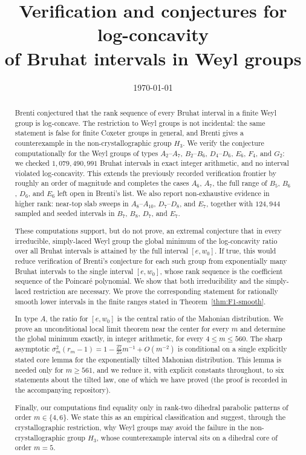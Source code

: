 \documentclass[11pt]{amsart}
\title[Log-concavity of Bruhat intervals in Weyl groups]
{Verification and conjectures for log-concavity\\ of Bruhat intervals in Weyl groups}
\author{}
\date{\today}
\theoremstyle{plain}
\theoremstyle{definition}
\theoremstyle{remark}
\begin{document}
\begin{abstract}
Brenti conjectured that the rank sequence of every Bruhat interval in a
finite Weyl group is log-concave. The restriction to Weyl groups is not
incidental: the same statement is false for finite Coxeter groups in
general, and Brenti gives a counterexample in the non-crystallographic
group $H_3$. We verify the conjecture
computationally for the Weyl groups of types $A_2$--$A_7$, $B_2$--$B_6$,
$D_4$--$D_6$, $E_6$, $F_4$, and $G_2$: we checked
$1{,}079{,}490{,}991$ Bruhat intervals in exact integer arithmetic, and no
interval violated log-concavity. This extends the previously recorded
verification frontier by roughly an order of magnitude and completes the
cases $A_6$, $A_7$, the full range of $B_5$, $B_6$, $D_6$, and $E_6$ left
open in Brenti's list. We also report non-exhaustive evidence in higher rank:
near-top slab sweeps in $A_8$--$A_{10}$, $D_7$--$D_8$, and $E_7$, together
with $124{,}944$ sampled and seeded intervals in $B_7$, $B_8$, $D_7$, and
$E_7$.

These computations support, but do not prove, an extremal conjecture that in every irreducible,
simply-laced Weyl group the global minimum of the
log-concavity ratio over all Bruhat intervals is attained by the full
interval $[e,w_0]$. If true, this would reduce verification of Brenti's
conjecture for each such group from exponentially many Bruhat intervals to
the single interval $[e,w_0]$, whose rank sequence is the coefficient
sequence of the Poincar\'e polynomial. We show that both irreducibility and
the simply-laced restriction are necessary. We prove the corresponding
statement for rationally smooth lower intervals in the finite ranges stated
in Theorem~\ref{thm:F1-smooth}.

In type $A$, the ratio for $[e,w_0]$ is the central ratio of the Mahonian
distribution. We prove an unconditional local limit theorem near the center
for every $m$ and determine the global minimum exactly, in integer
arithmetic, for every $4\le m\le560$. The sharp asymptotic
$\sigma_m^2(r_m-1) = 1-\tfrac{27}{25}m^{-1}+O(m^{-2})$ is conditional on a
single explicitly stated core lemma for the exponentially tilted Mahonian
distribution. This lemma is needed only for $m\ge561$, and we reduce it,
with explicit constants throughout, to six statements
about the tilted law, one of which we have proved (the proof is recorded
in the accompanying repository).

Finally, our computations find equality only in rank-two dihedral parabolic
patterns of order $m\in\{4,6\}$. We state this as an empirical
classification and suggest, through the crystallographic restriction, why
Weyl groups may avoid the failure in the non-crystallographic group $H_3$,
whose counterexample interval sits on a dihedral core of order $m=5$.
\end{abstract}
\end{document}
